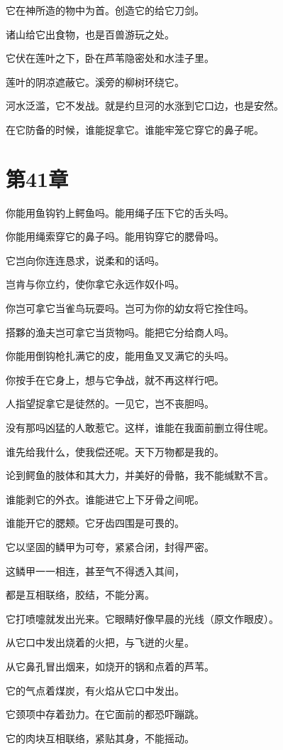 \documentclass[12pt,oneside]{book}
\begin{document}
它在神所造的物中为首。创造它的给它刀剑。

诸山给它出食物，也是百兽游玩之处。

它伏在莲叶之下，卧在芦苇隐密处和水洼子里。

莲叶的阴凉遮蔽它。溪旁的柳树环绕它。

河水泛滥，它不发战。就是约旦河的水涨到它口边，也是安然。

在它防备的时候，谁能捉拿它。谁能牢笼它穿它的鼻子呢。


\chapter{第41章}
你能用鱼钩钓上鳄鱼吗。能用绳子压下它的舌头吗。

你能用绳索穿它的鼻子吗。能用钩穿它的腮骨吗。

它岂向你连连恳求，说柔和的话吗。

岂肯与你立约，使你拿它永远作奴仆吗。

你岂可拿它当雀鸟玩耍吗。岂可为你的幼女将它拴住吗。

搭夥的渔夫岂可拿它当货物吗。能把它分给商人吗。

你能用倒钩枪扎满它的皮，能用鱼叉叉满它的头吗。

你按手在它身上，想与它争战，就不再这样行吧。

人指望捉拿它是徒然的。一见它，岂不丧胆吗。

没有那吗凶猛的人敢惹它。这样，谁能在我面前删立得住呢。

谁先给我什么，使我偿还呢。天下万物都是我的。

论到鳄鱼的肢体和其大力，并美好的骨骼，我不能缄默不言。

谁能剥它的外衣。谁能进它上下牙骨之间呢。

谁能开它的腮颊。它牙齿四围是可畏的。

它以坚固的鳞甲为可夸，紧紧合闭，封得严密。

这鳞甲一一相连，甚至气不得透入其间，

都是互相联络，胶结，不能分离。

它打喷嚏就发出光来。它眼睛好像早晨的光线（原文作眼皮）。

从它口中发出烧着的火把，与飞迸的火星。

从它鼻孔冒出烟来，如烧开的锅和点着的芦苇。

它的气点着煤炭，有火焰从它口中发出。

它颈项中存着劲力。在它面前的都恐吓蹦跳。

它的肉块互相联络，紧贴其身，不能摇动。
\end{document}
